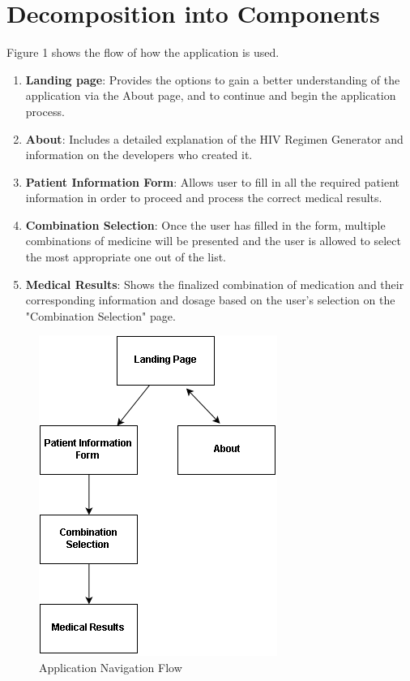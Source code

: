 \documentclass[12pt]{article}
\begin{document}
\section{Decomposition into Components}
Figure 1 shows the flow of how the application is used.
\begin{enumerate}
\item \textbf{Landing page}: Provides the options to gain a better understanding of the application via the About page, and to continue and begin the application process.
\item \textbf{About}: Includes a detailed explanation of the HIV Regimen Generator and information on the developers who created it.
\item \textbf{Patient Information Form}: Allows user to fill in all the required patient information in order to proceed and process the correct medical results.
\item \textbf{Combination Selection}: Once the user has filled in the form, multiple combinations of medicine will be presented and the user is allowed to select the most appropriate one out of the list.
\item \textbf{Medical Results}: Shows the finalized combination of medication and their corresponding information and dosage based on the user’s selection on the "Combination Selection" page.
\end{enumerate}

\begin{figure}
  \centering
  \includegraphics{navflow.png}
  \caption{Application Navigation Flow}
  \label{fig:Application Navigation Flow}
\end{figure}
\end{document}
